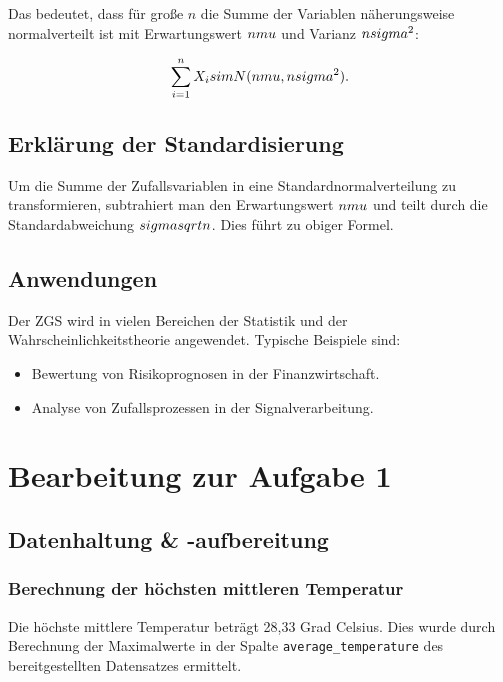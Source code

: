 \documentclass[12pt]{article}
\begin{document}
Das bedeutet, dass für große $n$ die Summe der Variablen näherungsweise normalverteilt ist mit Erwartungswert $n\\mu$ und Varianz $n\\sigma^2$:

\begin{equation}
\sum_{i=1}^n X_i \\sim N(n\\mu, n\\sigma^2).
\end{equation}

\subsection{Erklärung der Standardisierung}
Um die Summe der Zufallsvariablen in eine Standardnormalverteilung zu transformieren, subtrahiert man den Erwartungswert $n\\mu$ und teilt durch die Standardabweichung $\\sigma\\sqrt{n}$. Dies führt zu obiger Formel.

\subsection{Anwendungen}
Der ZGS wird in vielen Bereichen der Statistik und der Wahrscheinlichkeitstheorie angewendet. Typische Beispiele sind:
\begin{itemize}
    \item Bewertung von Risikoprognosen in der Finanzwirtschaft.
    \item Analyse von Zufallsprozessen in der Signalverarbeitung.
\end{itemize}

\section{Bearbeitung zur Aufgabe 1}
\subsection{Datenhaltung \& -aufbereitung}
\subsubsection{Berechnung der höchsten mittleren Temperatur}
Die höchste mittlere Temperatur beträgt 28,33 Grad Celsius. Dies wurde durch Berechnung der Maximalwerte in der Spalte \texttt{average\_temperature} des bereitgestellten Datensatzes ermittelt.
\end{document}
